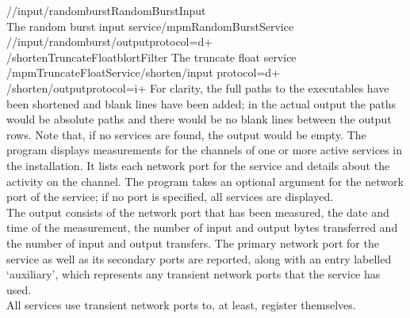 /\serviceName/input/randomburst\pseudotab{}RandomBurst\pseudotab\pseudotab{}Input
\pseudotab\\
The random burst input service\pseudotwotabs\textellipsis/mpmRandomBurstService%
\pseudotwotabs\\
/\serviceName/input/randomburst/output\textbraceleft{}protocol=d+\textbraceright\\

/shorten\pseudotab{}TruncateFloat\pseudotab{}blort\pseudotab{}Filter\pseudotab{}%
The truncate float service\pseudotwotabs\\
\textellipsis/mpmTruncateFloatService\pseudotab{}/shorten/input\textbraceleft{}%
protocol=d+\textbraceright\pseudotab\\
/shorten/output\textbraceleft{}protocol=i+\textbraceright
\outputEnd{}
For clarity, the full paths to the executables have been shortened and blank lines have
been added; in the actual output the paths would be absolute paths and there would be no
blank lines between the output rows.
Note that, if no services are found, the output would be empty.
The program  displays measurements for the channels of one
or more active services in the \mplusm{} installation.
It lists each \yarp{} network port for the service and details about the activity on the
channel.
The program takes an optional argument for the \yarp{} network port of the service; if no
port is specified, all services are displayed.\\

The output consists of the \yarp{} network port that has been measured, the date and time
of the measurement, the number of input and output bytes transferred and the number of
input and output transfers.
The primary \yarp{} network port for the service as well as its secondary ports are
reported, along with an entry labelled `auxiliary', which represents any transient
\yarp{} network ports that the service has used.\\

All services use transient \yarp{} network ports to, at least, register themselves.\\

